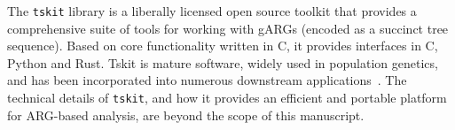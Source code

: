 \documentclass{article}
\begin{document}
The \texttt{tskit} library is a liberally
licensed open source toolkit that provides a comprehensive suite
of tools for working with gARGs (encoded as a succinct tree sequence).
Based on core functionality written
in C, it provides interfaces in C, Python and Rust.
Tskit is mature software, widely used in population genetics, and
has been incorporated into numerous downstream
applications~\citep[e.g.,][]{haller2019slim,speidel2019method,
adrion2020community,
terasaki2021geonomics,
baumdicker2021efficient,
fan2022genealogical,
guo2022recombination,
korfmann2022weak,
mahmoudi2022bayesian,
petr2023slendr,
rasmussen2022espalier,
zhang2023biobank,
nowbandegani2023extremely,
ignatieva2023distribution,
fan2023likelihood,
tsambos2023link,
tagami2024tstrait,
korfmann2024simultaneous}.
The technical details of \texttt{tskit}, and how it provides an
efficient and portable platform for ARG-based analysis, are beyond
the scope of this manuscript.
\end{document}
